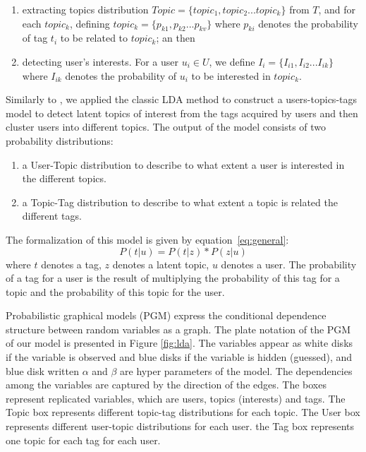 \begin{enumerate}
 \item extracting topics distribution $Topic=\{topic_1,topic_2...topic_k\}$ from $T$, and for each $topic_k$, defining $topic_k=\{p_{k1},p_{k2}...p_{kv}\}$ where $p_{ki}$ denotes the probability of tag $t_i$ to be related to $topic_k$; an then
  \item detecting user's interests. For a user $u_i \in U$, we define $I_i=\{I_{i1},I_{i2}...I_{ik}\}$ where $I_{ik}$ denotes the probability of $u_i$ to be interested in $topic_k$.
\end{enumerate}

Similarly to \cite{Li:2010:CTM:1871437.1871673}, we applied the classic LDA method to construct a users-topics-tags model to detect latent topics of interest from the tags acquired by users and then cluster users into different topics. The output of the model consists of two probability distributions:
\begin{enumerate}
 \item a User-Topic distribution to describe to what extent a user is interested in the different topics.
 \item a Topic-Tag distribution to describe to what extent a topic is related the different tags.
\end{enumerate}



The formalization of this model is given by equation~\ref{eq:general}: 
\begin{equation}
P(t|u)=P(t|z)*P(z|u)
\label{eq:general}
\end{equation}
where $t$ denotes a tag, $z$ denotes a latent topic, $u$ denotes a user. The probability of a tag for a user is the result of multiplying the probability of this tag for a topic and the probability of this topic for the user.

Probabilistic graphical models (PGM) express the conditional dependence structure between random variables as a graph. 
The plate notation of the PGM of our model is presented in Figure \ref{fig:lda}. 
The variables appear as white disks if the variable is observed and blue disks if the variable is hidden (guessed), and blue disk written $\alpha$ and $\beta$ are hyper parameters of the model.
The dependencies among the variables are captured by the direction of the edges. 
The boxes represent replicated variables, which are users, topics (interests) and tags. 
The Topic box represents different topic-tag distributions for each topic.
The User box represents different user-topic distributions for each user.
the Tag box represents one topic for each tag for each user.

